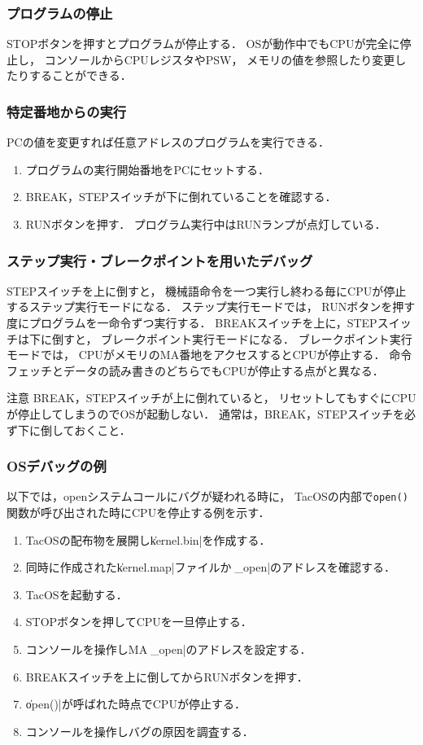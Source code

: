 \subsubsection{プログラムの停止}
STOPボタンを押すとプログラムが停止する．
OSが動作中でもCPUが完全に停止し，
コンソールからCPUレジスタやPSW，
メモリの値を参照したり変更したりすることができる．

\subsubsection{特定番地からの実行}
PCの値を変更すれば任意アドレスのプログラムを実行できる．

\begin{enumerate}
\item プログラムの実行開始番地をPCにセットする．
\item BREAK，STEPスイッチが下に倒れていることを確認する．
\item RUNボタンを押す．
  プログラム実行中はRUNランプが点灯している．
\end{enumerate}

\subsubsection{ステップ実行・ブレークポイントを用いたデバッグ}
STEPスイッチを上に倒すと，
機械語命令を一つ実行し終わる毎にCPUが停止するステップ実行モードになる．
ステップ実行モードでは，
RUNボタンを押す度にプログラムを一命令ずつ実行する．
BREAKスイッチを上に，STEPスイッチは下に倒すと，
ブレークポイント実行モードになる．
ブレークポイント実行モードでは，
CPUがメモリのMA番地をアクセスするとCPUが停止する．
命令フェッチとデータの読み書きのどちらでもCPUが停止する点が{\tec}と異なる．

\begin{itembox}[l]{注意}
  BREAK，STEPスイッチが上に倒れていると，
  リセットしてもすぐにCPUが停止してしまうのでOSが起動しない．
  通常は，BREAK，STEPスイッチを必ず下に倒しておくこと．
\end{itembox}

\subsubsection{OSデバッグの例}
以下では，openシステムコールにバグが疑われる時に，
TacOSの内部で\texttt{open()}関数が呼び出された時にCPUを停止する例を示す．

\begin{enumerate}
\item TacOSの配布物を展開し\|kernel.bin|を作成する．
\item 同時に作成された\|kernel.map|ファイルから\|_open|のアドレスを確認する．
\item TacOSを起動する．
\item STOPボタンを押してCPUを一旦停止する．
\item コンソールを操作しMAに\|_open|のアドレスを設定する．
\item BREAKスイッチを上に倒してからRUNボタンを押す．
\item \|open()|が呼ばれた時点でCPUが停止する．
\item コンソールを操作しバグの原因を調査する．
\end{enumerate}
